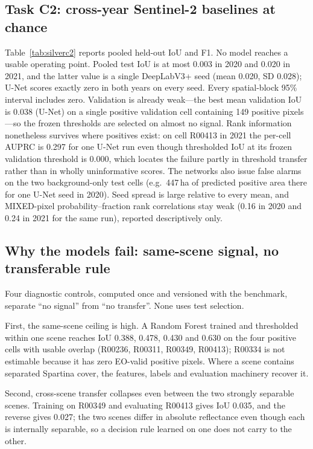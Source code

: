 \subsection{Task C2: cross-year Sentinel-2 baselines at chance}
Table~\ref{tab:silverc2} reports pooled held-out IoU and F1. No model
reaches a usable operating point. Pooled test IoU is at most 0.003 in
2020 and 0.020 in 2021, and the latter value is a single DeepLabV3+
seed (mean 0.020, SD 0.028); U-Net scores exactly zero in both years on
every seed. Every spatial-block 95\% interval includes zero.
Validation is already weak---the best mean validation IoU is 0.038
(U-Net) on a single positive validation cell containing 149 positive
pixels---so the frozen thresholds are selected on almost no signal.
Rank information nonetheless survives where positives exist: on cell
R00413 in 2021 the per-cell AUPRC is 0.297 for one U-Net run even
though thresholded IoU at its frozen validation threshold is 0.000,
which locates the failure partly in threshold transfer rather than in
wholly uninformative scores. The networks also issue false alarms on
the two background-only test cells (e.g.\ 447\,ha of predicted positive
area there for one U-Net seed in 2020). Seed spread is large relative
to every mean, and MIXED-pixel probability--fraction rank correlations
stay weak (0.16 in 2020 and 0.24 in 2021 for the same run), reported
descriptively only.



\subsection{Why the models fail: same-scene signal, no transferable rule}
Four diagnostic controls, computed once and versioned with the
benchmark, separate ``no signal'' from ``no transfer''. None uses test
selection.

First, the same-scene ceiling is high. A Random Forest trained and
thresholded within one scene reaches IoU 0.388, 0.478, 0.430 and 0.630
on the four positive cells with usable overlap (R00236, R00311, R00349,
R00413); R00334 is not estimable because it has zero EO-valid positive
pixels. Where a scene contains separated Spartina cover, the features,
labels and evaluation machinery recover it.

Second, cross-scene transfer collapses even between the two strongly
separable scenes. Training on R00349 and evaluating R00413 gives IoU
0.035, and the reverse gives 0.027; the two scenes differ in absolute
reflectance even though each is internally separable, so a decision
rule learned on one does not carry to the other.

